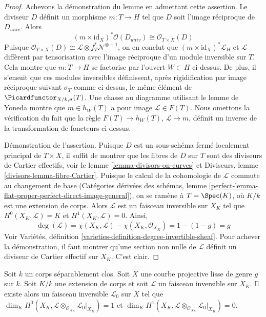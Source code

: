 \begin{proof}
\medskip\noindent
Achevons la démonstration du lemme en admettant cette assertion.
Le diviseur $D$ définit un morphisme $m : T \to H$ tel que $D$ soit l'image réciproque de
$D_{univ}$. Alors
$$
(m \times \text{id}_X)^*\mathcal{O}(D_{univ}) \cong
\mathcal{O}_{T \times X}(D)
$$
Puisque $\mathcal{O}_{T \times X}(D) \cong
\mathcal{L} \otimes f_T^*\mathcal{N}^{\otimes -1}$,
on en conclut que $(m \times \text{id}_X)^*\mathcal{L}_H$ et $\mathcal{L}$
diffèrent par tensorisation avec l'image réciproque d'un module inversible sur $T$.
Cela montre que $m : T \to H$ se factorise par l'ouvert $W \subset H$ ci-dessus.
De plus, il s'ensuit que ces modules inversibles définissent, après rigidification
par image réciproque suivant $\sigma_T$ comme ci-dessus, le même élément de
$\Picardfunctor_{X/k, \sigma}(T)$. Une chasse au diagramme utilisant le lemme de Yoneda
montre que $m \in h_W(T)$ a pour image $\mathcal{L} \in F(T)$. Nous omettons
la vérification du fait que la règle $F(T) \to h_W(T)$,
$\mathcal{L} \mapsto m$, définit un inverse de la transformation
de foncteurs ci-dessus.

\medskip\noindent
Démonstration de l'assertion. Puisque $D$ est un sous-schéma fermé localement principal
de $T \times X$, il suffit de montrer que les fibres de $D$ sur $T$ sont des
diviseurs de Cartier effectifs, voir le lemme \ref{lemma-divisors-on-curves} et
Diviseurs, lemme \ref{divisors-lemma-fibre-Cartier}. Puisque le calcul
de la cohomologie de $\mathcal{L}$ commute au changement de base
(Catégories dérivées des schémas, lemme
\ref{perfect-lemma-flat-proper-perfect-direct-image-general}),
on se ramène à $T = \Spec(K)$, où $K/k$ est une extension de corps.
Alors $\mathcal{L}$ est un faisceau inversible sur $X_K$ tel que
$H^0(X_K, \mathcal{L}) = K$ et $H^1(X_K, \mathcal{L}) = 0$. Ainsi,
$$
\deg(\mathcal{L}) = \chi(X_K, \mathcal{L}) - \chi(X_K, \mathcal{O}_{X_K})
= 1 - (1 - g) = g
$$
Voir Variétés, définition \ref{varieties-definition-degree-invertible-sheaf}.
Pour achever la démonstration, il faut montrer qu'une section non nulle de $\mathcal{L}$
définit un diviseur de Cartier effectif sur $X_K$.
C'est clair.
\end{proof}

\begin{lemma}
\label{lemma-twist-with-general-divisor}
Soit $k$ un corps séparablement clos. Soit $X$ une courbe projective lisse
de genre $g$ sur $k$. Soit $K/k$ une extension de corps et soit
$\mathcal{L}$ un faisceau inversible sur $X_K$. Il existe alors un
faisceau inversible $\mathcal{L}_0$ sur $X$ tel que
$\dim_K H^0(X_K,
\mathcal{L} \otimes_{\mathcal{O}_{X_K}} \mathcal{L}_0|_{X_K}) = 1$ et
$\dim_K H^1(X_K,
\mathcal{L} \otimes_{\mathcal{O}_{X_K}} \mathcal{L}_0|_{X_K}) = 0$.
\end{lemma}

